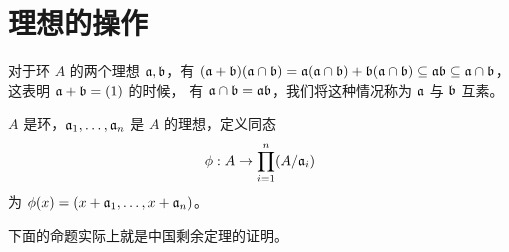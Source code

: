 \section{理想的操作}

对于环 $A$ 的两个理想 $\mathfrak{a},\mathfrak{b}$，有 
$(\mathfrak{a}+\mathfrak{b})(\mathfrak{a}\cap\mathfrak{b})
=\mathfrak{a}(\mathfrak{a}\cap\mathfrak{b})+\mathfrak{b}(\mathfrak{a}\cap \mathfrak{b})\subseteq \mathfrak{a}\mathfrak{b}\subseteq\mathfrak{a}\cap\mathfrak{b}$，这表明 $\mathfrak{a}+\mathfrak{b}=(1)$ 的时候，
有 $\mathfrak{a}\cap\mathfrak{b}=\mathfrak{a}\mathfrak{b}$，我们将这种情况称为 $\mathfrak{a}$ 与 $\mathfrak{b}$
互素。

$A$ 是环，$\mathfrak{a}_1,\dots,\mathfrak{a}_n$ 是 $A$ 的理想，定义同态
\[
  \phi:A\to\prod_{i=1}^n (A/\mathfrak{a}_i)
\]
为 $\phi(x)=(x+\mathfrak{a}_1,\dots,x+\mathfrak{a}_n)$。

下面的命题实际上就是中国剩余定理的证明。

